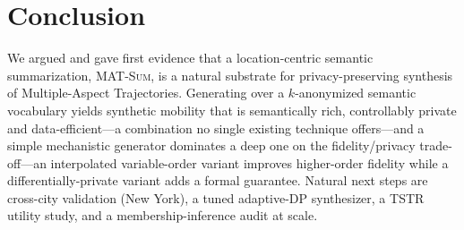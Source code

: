 \documentclass[sigconf,nonacm]{acmart}
\begin{document}
\section{Conclusion}
We argued and gave first evidence that a location-centric semantic summarization, \textsc{MAT-Sum}, is
a natural substrate for privacy-preserving synthesis of Multiple-Aspect Trajectories. Generating over
a $k$-anonymized semantic vocabulary yields synthetic mobility that is semantically rich, controllably
private and data-efficient---a combination no single existing technique offers---and a simple
mechanistic generator dominates a deep one on the fidelity/privacy trade-off---an interpolated
variable-order variant improves higher-order fidelity while a differentially-private variant adds a
formal guarantee. Natural next steps are cross-city validation (New York), a tuned adaptive-DP
synthesizer, a TSTR utility study, and a membership-inference audit at scale.
\end{document}
